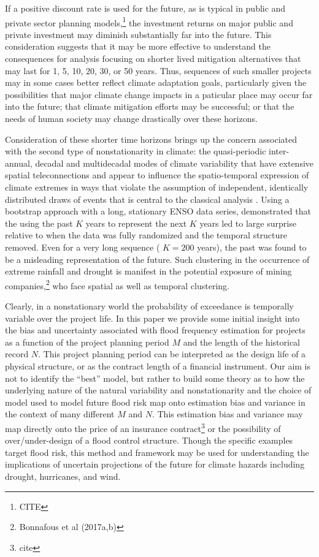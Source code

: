 \documentclass[12pt]{article}
\begin{document}
If a positive discount rate is used for the future, as is typical in public and private sector planning models,\footnote{CITE} the investment returns on major public and private investment may diminish substantially far into the future.
This consideration suggests that it may be more effective to understand the consequences for analysis focusing on shorter lived mitigation alternatives that may last for 1, 5, 10, 20, 30, or 50 years.
Thus, sequences of such smaller projects may in some cases better reflect climate adaptation goals, particularly given the possibilities that major climate change impacts in a paticular place may occur far into the future; that climate mitigation efforts may be successful; or that the needs of human society may change drastically over these horizons.

Consideration of these shorter time horizons brings up the concern associated with the second type of nonstationarity in climate: the quasi-periodic inter-annual, decadal and multidecadal modes of climate variability that have extensive spatial teleconnections and appear to influence the spatio-temporal expression of climate extremes in ways that violate the assumption of independent, identically distributed draws of events that is central to the classical analysis \citep[see][]{Merz2014,Serinaldi2015,Hoskins2015,Hannachi2017}.
Using a bootstrap approach with a long, stationary ENSO data series, \citet{Jain2001} demonstrated that the using the past \(K\) years to represent the next \(K\) years led to large surprise relative to when the data was fully randomized and the temporal structure removed.
Even for a very long sequence (\ie{} \(K=200\) years), the past was found to be a misleading representation of the future.
Such clustering in the occurrence of extreme rainfall and drought is manifest in the potential exposure of mining companies,\footnote{Bonnafous et al (2017a,b)} who face spatial as well as temporal clustering.

Clearly, in a nonstationary world the probability of exceedance is temporally variable over the project life.
In this paper we provide some initial insight into the bias and uncertainty associated with flood frequency estimation for projects as a function of the project planning period \(M\) and the length of the historical record \(N\).
This project planning period can be interpreted as the design life of a physical structure, or as the contract length of a financial instrument.
Our aim is not to identify the ``best'' model, but rather to build some theory as to how the underlying nature of the natural variability and nonstationarity and the choice of model used to model future flood risk map onto estimation bias and variance in the context of many different \(M\) and \(N\).
This estimation bias and variance may map directly onto the price of an insurance contract\footnote{cite} or the possibility of over/under-design of a flood control structure.
Though the specific examples target flood risk, this method and framework may be used for understanding the implications of uncertain projections of the future for climate hazards including drought, hurricanes, and wind.
\end{document}
